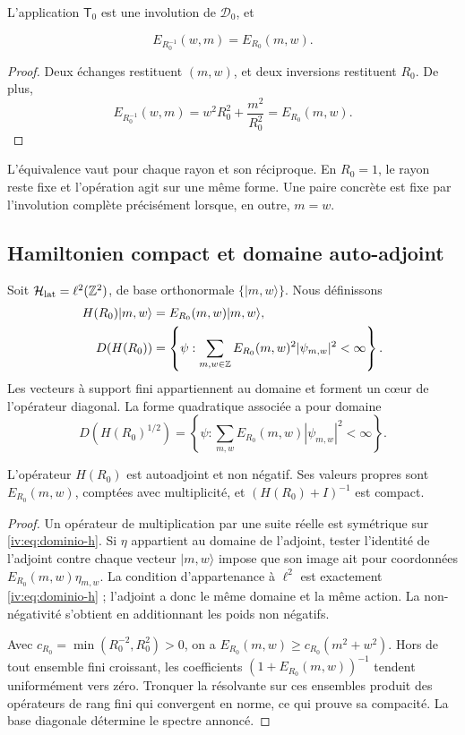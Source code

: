 \begin{theorem}
\label{iv:thm:dualidad-escalar}
L’application \(\mathsf T_0\) est une involution de
\(\mathscr D_0\), et

\[
 E_{R_0^{-1}}(w,m)=E_{R_0}(m,w).
\]
\end{theorem}
\begin{proof}
Deux échanges restituent \((m,w)\), et deux inversions restituent
\(R_0\). De plus,
\[
 E_{R_0^{-1}}(w,m)=w^2R_0^2+\frac{m^2}{R_0^2}
 =E_{R_0}(m,w).
\]
\end{proof}

L’équivalence vaut pour chaque rayon et son réciproque. En \(R_0=1\),
le rayon reste fixe et l’opération agit sur une même forme.
Une paire concrète est fixe par l’involution complète précisément
lorsque, en outre, \(m=w\).


\subsection{Hamiltonien compact et domaine auto-adjoint}

Soit \(\mathcal H_{\mathrm{lat}}=\ell^2(\mathbb Z^2)\), de base
orthonormale \(\{|m,w\rangle\}\). Nous définissons
\begin{align}
 H(R_0)|m,w\rangle&=E_{R_0}(m,w)|m,w\rangle,\label{iv:eq:hamiltoniano}\\
 D(H(R_0))&=\left\{\psi:\sum_{m,w\in\mathbb Z}
 E_{R_0}(m,w)^2|\psi_{m,w}|^2<\infty\right\}.\label{iv:eq:dominio-h}
\end{align}
Les vecteurs à support fini appartiennent au domaine et forment un
cœur de l’opérateur diagonal. La forme quadratique associée a pour
domaine
\[
 D(H(R_0)^{1/2})=\left\{\psi:\sum_{m,w}
 E_{R_0}(m,w)|\psi_{m,w}|^2<\infty\right\}.
\]

\begin{proposition}
\label{iv:prop:h-autoadjunto}
L’opérateur \(H(R_0)\) est autoadjoint et non négatif. Ses
valeurs propres sont \(E_{R_0}(m,w)\), comptées avec multiplicité,
et \((H(R_0)+I)^{-1}\) est compact.
\end{proposition}
\begin{proof}
Un opérateur de multiplication par une suite réelle est symétrique
sur \eqref{iv:eq:dominio-h}. Si \(\eta\) appartient au domaine
de l’adjoint, tester l’identité de l’adjoint contre chaque vecteur
\(|m,w\rangle\) impose que son image ait pour coordonnées
\(E_{R_0}(m,w)\eta_{m,w}\). La condition d’appartenance à
\(\ell^2\) est exactement \eqref{iv:eq:dominio-h} ; l’adjoint a donc
le même domaine et la même action. La non-négativité
s’obtient en additionnant les poids non négatifs.

Avec \(c_{R_0}=\min(R_0^{-2},R_0^2)>0\), on a
\(E_{R_0}(m,w)\geq c_{R_0}(m^2+w^2)\). Hors de tout
ensemble fini croissant, les coefficients
\((1+E_{R_0}(m,w))^{-1}\) tendent uniformément vers zéro.
Tronquer la résolvante sur ces ensembles produit des opérateurs
de rang fini qui convergent en norme, ce qui prouve sa
compacité. La base diagonale détermine le spectre annoncé.

\end{proof}

